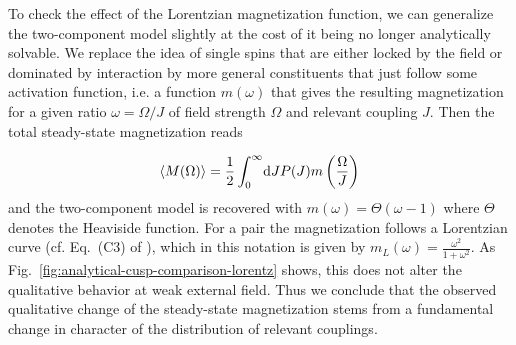 To check the effect of the Lorentzian magnetization function, we can generalize the two-component model slightly at the cost of it being no longer analytically solvable. We replace the idea of single spins that are either locked by the field or dominated by interaction by more general constituents that just follow some activation function, i.e. a function $m(\omega)$ that gives the resulting magnetization for a given ratio $\omega=\Omega/J$ of field strength $\Omega$ and relevant coupling $J$. Then the total steady-state magnetization reads

\begin{equation}\label{eq:generalized-two-component-model}
	\braket{M(\Omega)} = \frac{1}{2}\int_0^{\infty}\!\mathrm{d}J P(J)m\left(\frac{\Omega}{J}\right)
\end{equation}
and the two-component model is recovered with $m(\omega)=\Theta(\omega - 1)$ where $\Theta$ denotes the Heaviside function. For a pair the magnetization follows a Lorentzian curve (cf. Eq.~(C3) of \cite{franzEmergentPairLocalization2022}), which in this notation is given by $m_L(\omega) = \frac{\omega^2}{1+\omega^2}$. As Fig.~\ref{fig:analytical-cusp-comparison-lorentz} shows, this does not alter the qualitative behavior at weak external field. Thus we conclude that the observed qualitative change of the steady-state magnetization stems from a fundamental change in character of the distribution of relevant couplings.

%
%
%
%



